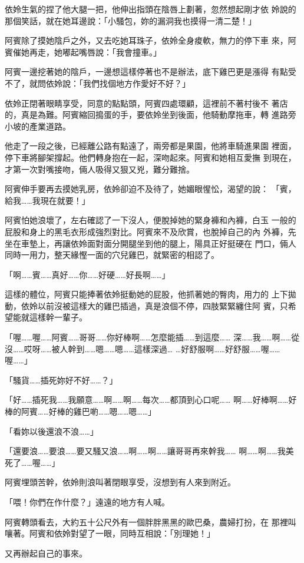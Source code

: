 依姈生氣的捏了他大腿一把，他伸出指頭在陰唇上劃著，忽然想起剛才依
姈說的那個笑話，就在她耳邊說：「小騷包，妳的漏洞我也摸得一清二楚！」

阿賓除了摸她陰戶之外，又去吃她耳珠子，依姈全身痠軟，無力的停下車
來，阿賓催她再走，她嘟起嘴唇說：「我會撞車。」

阿賓一邊挖著她的陰戶，一邊想這樣停著也不是辦法，底下雞巴更是漲得
有點受不了，就問依姈說：「我們找個地方作愛好不好？」

依姈正閉著眼睛享受，同意的點點頭，阿賓四處環顧，這裡前不著村後不
著店的，真是為難。阿賓縮回搗蛋的手，要依姈坐到後面，他騎動摩拖車，轉
進路旁小坡的產業道路。

他走了一段之後，已經離公路有點遠了，兩旁都是果園，他將車騎進果園
裡面，停下車將腳架撐起。他們轉身抱在一起，深吻起來。阿賓和她相互愛撫
到現在，才第一次對嘴接吻，倆人吸得又狠又兇，難分難捨。

阿賓伸手要再去摸她乳房，依姈卻迫不及待了，她媚眼惺忪，渴望的說：
「賓，給我……我現在就要！」

阿賓怕她浪壞了，左右確認了一下沒人，便脫掉她的緊身褲和內褲，白玉
一般的屁股和身上的黑毛衣形成強烈對比。阿賓來不及欣賞，也脫掉自己的內
外褲，先坐在車墊上，再讓依姈面對面分開腿坐到他的腿上，陽具正好挺硬在
門口，倆人同時一用力，整天緣慳一面的穴兒雞巴，就緊密的相認了。

「啊……賓……真好……你……好硬……好長啊……」

這樣的體位，阿賓只能捧著依姈挺動她的屁股，他抓著她的臀肉，用力的
上下拋動，依姈以前沒被這樣大的雞巴插過，真是浪個不停，四肢緊緊纏住阿
賓，只希望能就這樣幹一輩子。

「喔……喔……阿賓……哥哥……你好棒啊……怎麼能插……到這麼……
深……我……啊……從沒……哎呀……被人幹到……嗯……嗯……這樣深過…
…好舒服啊……好舒服……喔……喔……」

「騷貨……插死妳好不好……？」

「好……插死我……我願意……啊……啊……每次……都頂到心口呢……
啊……好棒啊……好棒的阿賓……好棒的雞巴喲……嗯……嗯……」

「看妳以後還浪不浪……」

「還要浪……要浪……要又騷又浪……啊……啊……讓哥哥再來幹我……
啊……啊……我美死了……喔……」

阿賓埋頭苦幹，依姈則浪叫著閉眼享受，沒想到有人來到附近。

「喂！你們在作什麼？」遠遠的地方有人喊。

阿賓轉頭看去，大約五十公尺外有一個胖胖黑黑的歐巴桑，農婦打扮，在
那裡叫嚷著。阿賓和依姈對望了一眼，同時互相說：「別理她！」

又再辦起自己的事來。

